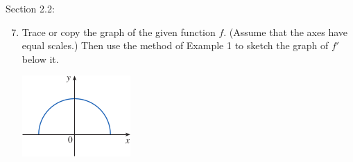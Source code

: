 \documentclass[12pt]{article}
\begin{document}
\newpage

Section 2.2:
\begin{enumerate}
    \setcounter{enumi}{6}
    \item Trace or copy the graph of the given function $f$. (Assume that the axes have equal scales.) Then use the method of Example 1 to sketch the graph of $f'$ below it.
          \begin{center}
              \includegraphics{Images/Image-2.png}
          \end{center}
          \begin{figure}[!h]
              \begin{framed}
                  \centering
              \end{framed}
          \end{figure}
\end{enumerate}

\newpage
\end{document}

